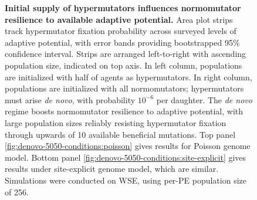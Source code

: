 \begin{figure}[h]
  \begin{minipage}{\textwidth}
    \caption{%
      \textbf{Initial supply of hypermutators influences normomutator resilience to available adaptive potential.}
      \footnotesize
      Area plot strips track hypermutator fixation probability across surveyed levels of adaptive potential, with error bands providing bootstrapped 95\% confidence interval.
      Strips are arranged left-to-right with ascending population size, indicated on top axis.
      In left column, populations are initialized with half of agents as hypermutators.
      In right column, populations are initialized with all normomutators; hypermutators must arise \textit{de novo}, with probability $10^{-6}$ per daughter.
      The \textit{de novo} regime boosts normomutator resilience to adaptive potential, with large population sizes reliably resisting hypermutator fixation through upwards of 10 available beneficial mutations.
      Top panel \ref{fig:denovo-5050-conditions:poisson} gives results for Poisson genome model.
      Bottom panel \ref{fig:denovo-5050-conditions:site-explicit} gives results under site-explicit genome model, which are similar.
      Simulations were conducted on WSE, using per-PE population size of 256.
    }
    \label{fig:denovo-5050-conditions}
  \end{minipage}
\end{figure}
